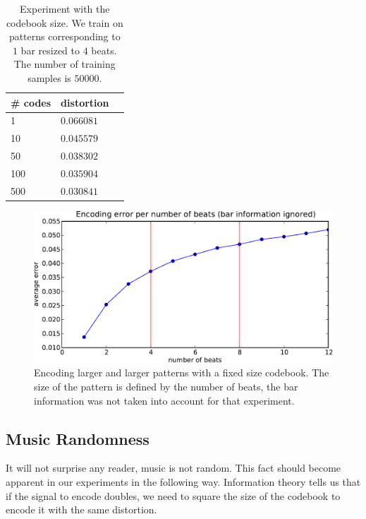\documentclass{article}
\begin{document}
\begin{table}
\begin{center}
\begin{tabular}{|l|l|c|}
\hline
\# codes & distortion \\ \hline \hline
1 & $0.066081$ \\
10 & $0.045579$ \\
50 & $0.038302$ \\
100 & $0.035904$ \\
500 & $0.030841$ \\ \hline
\end{tabular}
\end{center}
\caption{\small{Experiment with the codebook size. We train on patterns
corresponding to $1$ bar resized to $4$ beats. 
The number of training samples is $50000$.
}}
\label{tab:cbsize}
\end{table}


\begin{figure}[htb]
\begin{center}
\includegraphics[width=.9\columnwidth]{encoding_per_beat}
\end{center}
\caption{\small{Encoding larger and larger patterns with a fixed size
codebook. The size of the pattern is defined by the number of beats,
the bar information was not taken into account for that experiment.
}}
\label{fig:perbeat}
\end{figure}

\subsection{Music Randomness}\label{ssec:random}
It will not surprise any reader, music is not random. This fact should
become apparent in our experiments in the following way. Information
theory tells us that if the signal to encode doubles, we need to square
the size of the codebook to encode it with the same distortion.
\end{document}
